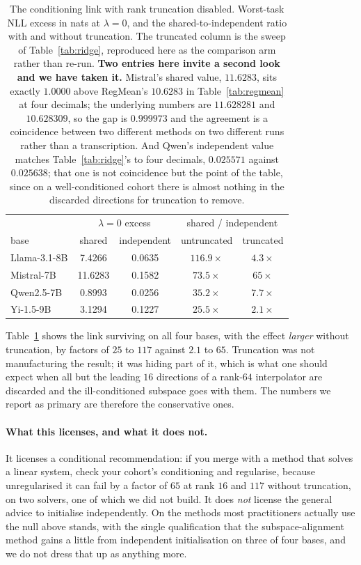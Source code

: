 \begin{table}[htb]
\centering
\small
\caption{The conditioning link with rank truncation disabled. Worst-task NLL
excess in nats at $\lambda = 0$, and the shared-to-independent ratio with and
without truncation. The truncated column is the sweep of
Table~\ref{tab:ridge}, reproduced here as the comparison arm rather than
re-run. \textbf{Two entries here invite a second look and we have taken it.}
Mistral's shared value, $11.6283$, sits exactly $1.0000$ above RegMean's
$10.6283$ in Table~\ref{tab:regmean} at four decimals; the underlying numbers
are $11.628281$ and $10.628309$, so the gap is $0.999973$ and the agreement is
a coincidence between two different methods on two different runs rather than
a transcription. And Qwen's independent value matches
Table~\ref{tab:ridge}'s to four decimals, $0.025571$ against $0.025638$;
that one is not coincidence but the point of the table, since on a
well-conditioned cohort there is almost nothing in the discarded directions
for truncation to remove.}
\label{tab:untruncated}
\begin{tabular}{lcccc}
\toprule
 & \multicolumn{2}{c}{$\lambda = 0$ excess} & \multicolumn{2}{c}{shared / independent} \\
base & shared & independent & untruncated & truncated \\
\midrule
Llama-3.1-8B & 7.4266  & 0.0635 & $116.9\times$ & $4.3\times$ \\
Mistral-7B   & 11.6283 & 0.1582 & $73.5\times$  & $65\times$ \\
Qwen2.5-7B   & 0.8993  & 0.0256 & $35.2\times$  & $7.7\times$ \\
Yi-1.5-9B    & 3.1294  & 0.1227 & $25.5\times$  & $2.1\times$ \\
\bottomrule
\end{tabular}
\end{table}

Table~\ref{tab:untruncated} shows the link surviving on all four bases, with the effect \emph{larger}
without truncation, by factors of $25$ to $117$ against $2.1$ to $65$.
Truncation was not manufacturing the result; it was hiding part of it,
which is what one should expect when all but the leading $16$ directions
of a rank-$64$ interpolator are discarded and the ill-conditioned subspace
goes with them. The numbers we report as primary are therefore the
conservative ones.

\paragraph{What this licenses, and what it does not.} It licenses a
conditional recommendation: if you merge with a method that solves a
linear system, check your cohort's conditioning and regularise, because
unregularised it can fail by a factor of $65$ at rank $16$ and $117$
without truncation, on two solvers, one of which we did not build. It does
\emph{not} license the general advice to initialise independently. On the
methods most practitioners actually use the null above stands, with the
single qualification that the subspace-alignment method gains a little
from independent initialisation on three of four bases, and we do not
dress that up as anything more.

